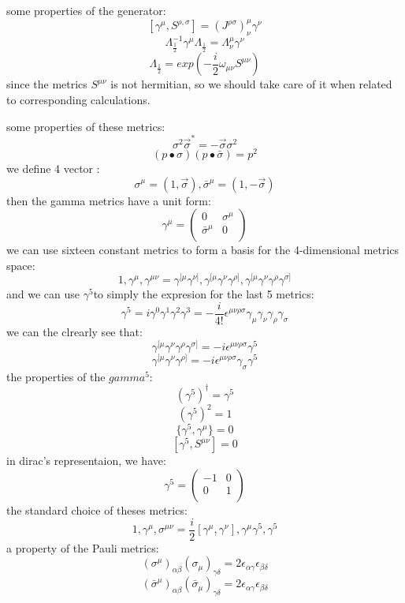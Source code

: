 some properties of the generator:
\[[\gamma^{\mu},S^{\rho,\sigma}]=(J^{\rho\sigma})^\mu_\nu\gamma^\nu\]
\[\Lambda_{\frac{1}{2}}^{-1}\gamma^\mu\Lambda_{\frac{1}{2}}=\Lambda^\mu_\nu \gamma^\nu\]
\[\Lambda_{\frac{1}{2}}=exp({-\frac{i}{2}\omega_{\mu\nu}S^{\mu\nu}})\]
since the metrics $S^{\mu\nu}$ is not hermitian, so we should take care of it when related to corresponding calculations.\par
some properties of these metrics:
\[\sigma^2\vec{\sigma}^*=-\vec{\sigma}\sigma^2\]
\[(p\bullet\sigma)(p\bullet\bar{\sigma})=p^2\]
we define 4 vector :
\[\sigma^\mu=(1,\vec{\sigma}),\bar{\sigma}^\mu=(1,-\vec{\sigma})\]
then the gamma metrics have a unit form:
\begin{equation}
\gamma^\mu=\left(
\begin{array}{cc}
0&\sigma^\mu\\
\bar{\sigma}^\mu&0\\
\end{array}
\right)
\end{equation}
we can use sixteen constant metrics to form a basis for the 4-dimensional metrics space:
\[1,\gamma^\mu,\gamma^{\mu\nu}=\gamma^{[\mu}\gamma^{\nu]},\gamma^{[\mu}\gamma^{\nu}\gamma^{\rho]},\gamma^{[\mu}\gamma^{\nu}\gamma^{\rho}\gamma^{\sigma]}\]
and we can use $\gamma^5$to simply the expresion for the last 5 metrics:
\[\gamma^5=i\gamma^0\gamma^1\gamma^2\gamma^3=-\frac{i}{4!}\epsilon^{\mu\nu\rho\sigma}\gamma_\mu\gamma_\nu\gamma_\rho\gamma_\sigma\]
we can the clrearly see that:
\[\gamma^{[\mu}\gamma^{\nu}\gamma^{\rho}\gamma^{\sigma]}=-i\epsilon^{\mu\nu\rho\sigma}\gamma^5\]
\[\gamma^{[\mu}\gamma^{\nu}\gamma^{\rho]}=-i\epsilon^{\mu\nu\rho\sigma}\gamma_\sigma\gamma^5\]
the properties of the $gamma^5$:
\[(\gamma^5)^\dagger=\gamma^5\]
\[(\gamma^5)^2=1\]
\[\{\gamma^5,\gamma^\mu\}=0\]
\[[\gamma^5,S^{\mu\nu}]=0\]
in dirac's representaion, we have:
\begin{equation}
\gamma^5=\left(
\begin{array}{cc}
-1&0\\
0&1\\
\end{array}
\right)
\end{equation}
the standard choice of theses metrics:
\[1,\gamma^\mu,\sigma^{\mu\nu}=\frac{i}{2}[\gamma^\mu,\gamma^\nu],\gamma^\mu\gamma^5,\gamma^5\]
a property of the Pauli metrics:
\[(\sigma^\mu)_{\alpha\beta}(\sigma_\mu)_{\gamma\delta}=2\epsilon_{\alpha\gamma}\epsilon_{\beta\delta}\]
\[(\bar{\sigma}^\mu)_{\alpha\beta}(\bar{\sigma}_\mu)_{\gamma\delta}=2\epsilon_{\alpha\gamma}\epsilon_{\beta\delta}\]

